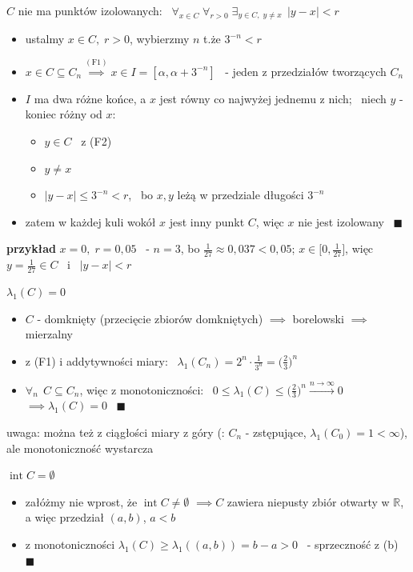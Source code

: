 \documentclass[a4paper,12pt]{article}
\begin{document}
\begin{podpunkty}
    \item \(C\) nie ma punktów izolowanych: \, \(\forall_{x \in C} \; \forall_{r > 0} \; \exists_{y \in C, \; y \neq x} \;\, |y - x| < r\)
    \begin{itemize}
        \item ustalmy \(x \in C, \; r > 0\), \; wybierzmy \(n\) t.że \(3^{-n} < r\)
        \item \(x \in C \subseteq C_n \overset{(\text{F1})}{\implies} x \in I = [\alpha, \alpha + 3^{-n}]\) \, - jeden z przedziałów tworzących \(C_n\)
        \item \(I\) ma dwa różne końce, a \(x\) jest równy co najwyżej jednemu z nich; \, niech \(y\) - koniec różny od \(x\):
        \begin{itemize}
            \item \(y \in C\) \, z (F2)
            \item \(y \neq x\)
            \item \(|y - x| \leq 3^{-n} < r\), \, bo \(x, y\) leżą w przedziale długości \(3^{-n}\)
        \end{itemize}
        \item zatem w każdej kuli wokół \(x\) jest inny punkt \(C\), więc \(x\) nie jest izolowany \, \(\blacksquare\)
    \end{itemize}

    \smallskip
    \begin{logbox}
    \textbf{przykład} \; \(x = 0, \; r = 0{,}05\) \, - \(n = 3\), bo \(\frac{1}{27} \approx 0{,}037 < 0{,}05\); \; \(x \in \big[0, \frac{1}{27}\big]\), więc \(y = \frac{1}{27} \in C\) \, i \, \(|y - x| < r\)
    \end{logbox}
    \item \(\lambda_1(C) = 0\)
    \begin{itemize}
        \item \(C\) - domknięty (przecięcie zbiorów domkniętych) \(\implies\) borelowski \(\implies\) mierzalny
        \item z (F1) i addytywności miary: \, \(\lambda_1(C_n) = 2^n \cdot \frac{1}{3^n} = \big(\frac{2}{3}\big)^n\)
        \item \(\forall_n \;\, C \subseteq C_n\), więc z monotoniczności: \, \(0 \leq \lambda_1(C) \leq \big(\frac{2}{3}\big)^n \xrightarrow{n \to \infty} 0\) \(\implies \lambda_1(C) = 0\) \, \(\blacksquare\)
    \end{itemize}
    uwaga: można też z ciągłości miary z góry (: \(C_n\) - zstępujące, \(\lambda_1(C_0) = 1 < \infty\)), ale monotoniczność wystarcza
    \item \(\operatorname{int} C = \emptyset\)
    \begin{itemize}
        \item załóżmy nie wprost, że \(\operatorname{int} C \neq \emptyset\) \(\implies C\) zawiera niepusty zbiór otwarty w \(\mathbb{R}\), a więc przedział \((a, b)\), \(a < b\)
        \item z monotoniczności \(\lambda_1(C) \geq \lambda_1((a, b)) = b - a > 0\) \, - sprzeczność z (b) \, \(\blacksquare\)
    \end{itemize}
\end{podpunkty}
\end{document}
